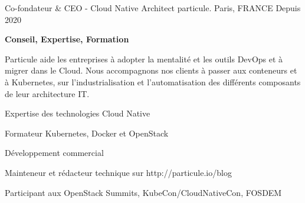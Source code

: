 

\begin{cventries}

\cventry
    {Co-fondateur \& CEO - Cloud Native Architect} %
    {particule.} %
    {Paris, FRANCE} %
    {Depuis 2020} %
    {
      \begin{cvitems} %
      \item {\textbf{Conseil, Expertise, Formation}}
      \item {Particule aide les entreprises à adopter la mentalité et les outils DevOps
        et à migrer dans le Cloud. Nous accompagnons nos clients à passer aux
          conteneurs et à Kubernetes, sur l'industrialisation et
          l'automatisation des différents composants de leur architecture IT.}
        \item {Expertise des technologies Cloud Native}
        \item {Formateur Kubernetes, Docker et OpenStack}
        \item {Développement commercial}
        \item {Mainteneur et rédacteur technique sur http://particule.io/blog}
        \item {Participant aux OpenStack Summits, KubeCon/CloudNativeCon, FOSDEM}
      \end{cvitems}
    }


\end{cventries}
